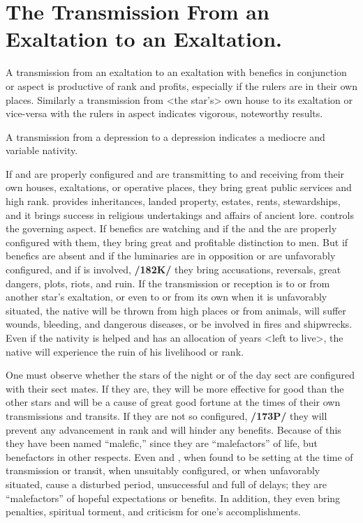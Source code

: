 \section{The Transmission From an Exaltation to an Exaltation.}
A transmission from an exaltation to an exaltation with benefics in conjunction or aspect is productive of rank and profits, especially if the rulers are in their own places. Similarly a transmission from <the star’s> own house to its exaltation or vice-versa with the rulers in aspect indicates vigorous, noteworthy results. 

A transmission from a depression to a depression indicates a mediocre and variable nativity.

If \Saturn\xspace and \Mars\xspace are properly configured and are transmitting to and receiving from their own houses,
exaltations, or operative places, they bring great public services and high rank. \Saturn\xspace provides inheritances, landed property, estates, rents, stewardships, and it brings success in religious undertakings and affairs of ancient lore. \Mars\xspace controls the governing aspect. If benefics are watching and if the \Sun\xspace and the \Moon\xspace are properly configured with them, they bring great and profitable distinction to men. But if benefics are absent and if the luminaries are in opposition or are unfavorably configured, and if \Mercury\xspace is involved, \textbf{/182K/} they bring accusations, reversals, great dangers, plots, riots, and ruin.
If the transmission or reception is to or from another star’s exaltation, or even to or from its own when it is unfavorably
situated, the native will be thrown from high places or from animals, will suffer wounds, bleeding, and dangerous diseases, or be involved in fires and shipwrecks. Even if the nativity is helped and has an allocation of years <left to live>, the native will experience the ruin of his livelihood or rank.

One must observe whether the stars of the night or of the day sect are configured with their sect mates. If they are, they will be more effective for good than the other stars and will be a cause of great good fortune at the times of their own transmissions and transits. If they are not so configured, \textbf{/173P/} they will prevent any advancement in rank and will hinder any benefits. Because of this they have been named “malefic,” since they are “malefactors” of life, but benefactors in other respects. Even \Jupiter\xspace and \Venus, when found to be setting at the time of transmission or transit, when unsuitably configured, or when unfavorably
situated, cause a disturbed period, unsuccessful and full of delays; they are “malefactors” of hopeful expectations or benefits. In addition, they even bring penalties, spiritual torment, and criticism for one’s accomplishments.

\newpage